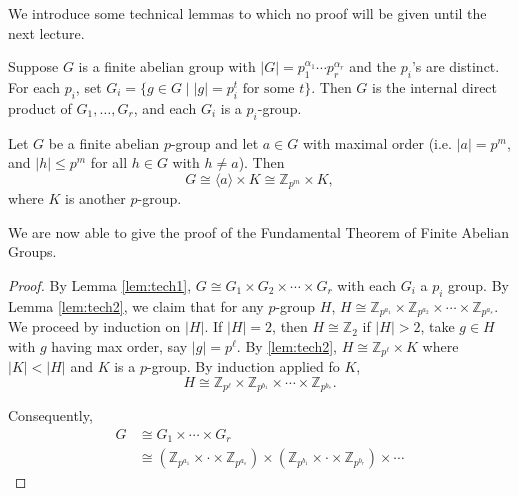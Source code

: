 We introduce some technical lemmas to which no proof will be given until the next lecture.

\begin{lemma}\label{lem:tech1}
	Suppose $G$ is a finite abelian group with $|G|=p_1^{\alpha_1}\cdots p_r^{\alpha_r}$ and the $p_i$'s are distinct. For each $p_i$, set $G_i=\{g\in G\mid |g|=p_i^t\text{ for some }t\}$. Then $G$ is the internal direct product of $G_1,\hdots,G_r$, and each $G_i$ is a $p_i$-group.
\end{lemma}

\begin{lemma}\label{lem:tech2}
	Let $G$ be a finite abelian $p$-group and let $a\in G$ with maximal order (i.e. $|a|=p^m$, and $|h|\leq p^m$ for all $h\in G$ with $h\neq a$). Then
	$$G\cong\langle a\rangle\times K\cong\mathbb Z_{p^m}\times K,$$
	where $K$ is another $p$-group.
\end{lemma}

We are now able to give the proof of the Fundamental Theorem of Finite Abelian Groups.

\begin{proof}
	By Lemma \ref{lem:tech1}, $G\cong G_1\times G_2\times\cdots\times G_r$ with each $G_i$ a $p_i$ group. By Lemma \ref{lem:tech2}, we claim that for any $p$-group $H$, $H\cong\mathbb Z_{p^{a_1}}\times \mathbb Z_{p^{a_2}}\times\cdots\times \mathbb Z_{p^{a_s}}$. We proceed by induction on $|H|$. If $|H|=2$, then $H\cong\mathbb Z_2$ if $|H|>2$, take  $g\in H$ with $g$ having max order, say $|g|=p^\ell$. By \ref{lem:tech2}, $H\cong\mathbb Z_{p^\ell}\times K$ where $|K|<|H|$ and $K$ is a $p$-group. By induction applied fo $K$,
	$$H\cong\mathbb Z_{p^\ell}\times\mathbb Z_{p^{b_1}}\times\cdots\times\mathbb Z_{p^{b_s}}.$$

	Consequently,
	\begin{align*}
		G&\cong G_1\times\cdots\times G_r\\
		&\cong (\mathbb Z_{p^{a_1}}\times\cdot\times\mathbb Z_{p^{a_s}})\times (\mathbb Z_{p^{b_1}}\times\cdot\times\mathbb Z_{p^{b_r}})\times\cdots
	\end{align*}
\end{proof}